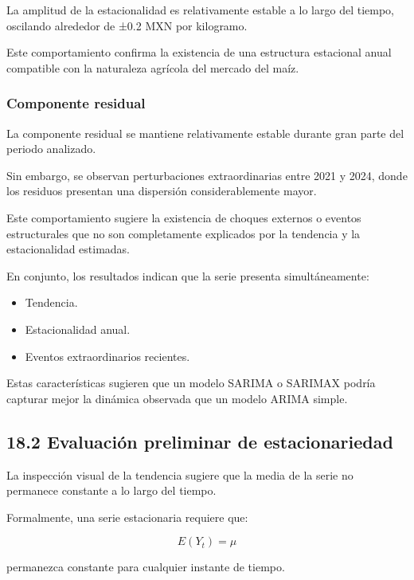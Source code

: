 \documentclass[11pt]{article}
\providecommand{\tightlist}{%
      \setlength{\itemsep}{0pt}\setlength{\parskip}{0pt}}
\begin{document}
La amplitud de la estacionalidad es relativamente estable a lo largo del
tiempo, oscilando alrededor de ±0.2 MXN por kilogramo.

Este comportamiento confirma la existencia de una estructura estacional
anual compatible con la naturaleza agrícola del mercado del maíz.

\hypertarget{componente-residual}{%
\subsubsection{Componente residual}\label{componente-residual}}

La componente residual se mantiene relativamente estable durante gran
parte del periodo analizado.

Sin embargo, se observan perturbaciones extraordinarias entre 2021 y
2024, donde los residuos presentan una dispersión considerablemente
mayor.

Este comportamiento sugiere la existencia de choques externos o eventos
estructurales que no son completamente explicados por la tendencia y la
estacionalidad estimadas.

En conjunto, los resultados indican que la serie presenta
simultáneamente:

\begin{itemize}
\tightlist
\item
  Tendencia.
\item
  Estacionalidad anual.
\item
  Eventos extraordinarios recientes.
\end{itemize}

Estas características sugieren que un modelo SARIMA o SARIMAX podría
capturar mejor la dinámica observada que un modelo ARIMA simple.

    \hypertarget{evaluaciuxf3n-preliminar-de-estacionariedad}{%
\subsection{18.2 Evaluación preliminar de
estacionariedad}\label{evaluaciuxf3n-preliminar-de-estacionariedad}}

La inspección visual de la tendencia sugiere que la media de la serie no
permanece constante a lo largo del tiempo.

Formalmente, una serie estacionaria requiere que:

\[
E(Y_t)=\mu
\]

permanezca constante para cualquier instante de tiempo.
\end{document}
